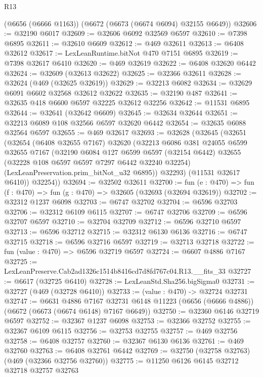 \begin{lexlean}{R13}
\begin{coremodule}
    (@6656 (@6666 @1163))
    (@6672 (@6673 (@6674 @6094) @32155 @6649))
@32606 := @32190 @6017
@32609 := @32606 @6092 @32569 @6597
@32610 := @7398 @6895
@32611 := @32610 @6609
@32612 := @469 @32611
@32613 := @6408 @32612
@32617 := LexLeanRuntime.bitNot @470 @7151 @6895
@32619 := @7398 @32617 @6410
@32620 := @469 @32619
@32622 := @6408 @32620 @6442
@32624 := @32609 (@32613 @32622)
@32625 := @32366 @32611
@32628 := @32624 (@469 (@32625 @32619))
@32629 := @32213 @6082
@32634 := @32629 @6091 @6602 @32568 @32612 @32622
@32635 := @32190 @487
@32641 := @32635 @418 @6600 @6597 @32225 @32612 @32256
@32642 := @11531 @6895
@32644 := @32641 (@32642 @6609)
@32645 := @32634 @32644
@32651 := @32213 @6089 @108 @32566 @6597 @32620 @6442
@32654 := @32635 @6088 @32564 @6597
@32655 := @469 @32617
@32693 := @32628
    (@32645
      (@32651
        (@32654
          (@6408 @32655 @7167)
          @32620
          (@32213
            @6086
            @381
            @24055
            @6599
            @32655
            @7167
            (@32190
              @6084
              @127
              @6599
              @6597
              (@32154 @6442)
              @32655
              (@32228 @108 @6597 @6597 @7297 @6442 @32240 @32254)
              (LexLeanPreservation.prim_bitNot_u32 @6895))
            @32293)
          (@11531 @32617 @6410))
        @32254))
@32694 := @32502 @32611
@32700 := fun (e : @470) => fun (f : @470) => fun (g : @470) => @32605 (@32693 (@32694 @32619))
@32702 := @32312 @1237 @6098
@32703 := @6747 @32702
@32704 := @6596 @32703
@32706 := @32312 @6109 @6115
@32707 := @6747 @32706
@32709 := @6596 @32707 @6597
@32710 := @32704 @32709
@32712 := @6596 @32710 @6597
@32713 := @6596 @32712
@32715 := @32312 @6130 @6136
@32716 := @6747 @32715
@32718 := @6596 @32716 @6597
@32719 := @32713 @32718
@32722 := fun (value : @470) => @6596 @32719 @6597
@32724 := @6607 @4886 @7167
@32725 := LexLeanPreserve.Cab2ad1326c1514b8416cd7d8fd767c04.R13.__fits_33
@32727 := @6617 (@32725 @6410)
@32728 := LexLeanStd.Sha256.bigSigma0
@32731 := @32727 (@469 (@32728 @6410))
@32733 := (value : @470) -> @32724 @32731
@32747 := @6631
    @4886
    @7167
    @32731
    @6148
    @11223
    (@6656 (@6666 @4886))
    (@6672 (@6673 (@6674 @6148) @7167 @6649))
@32750 := @32360 @6146 @32719 @6597
@32752 := @32367 @1237 @6098
@32753 := @32366 @32752
@32755 := @32367 @6109 @6115
@32756 := @32753 @32755
@32757 := @469 @32756
@32758 := @6408 @32757
@32760 := @32367 @6130 @6136
@32761 := @469 @32760
@32763 := @6408 @32761 @6442
@32769 := @32750 (@32758 @32763) (@469 (@32366 @32756 @32760))
@32775 := @11250 @6126 @6145 @32712 @32718 @32757 @32763

\end{coremodule}
\end{lexlean}
